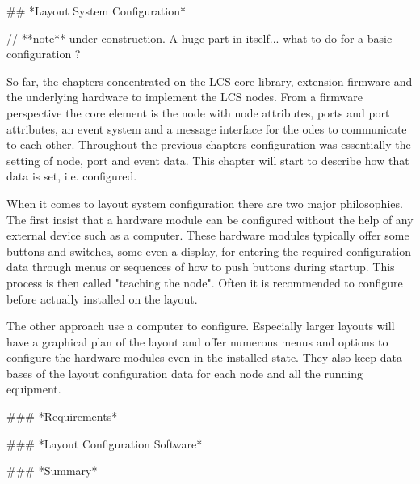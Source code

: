 ## *Layout System Configuration*

// **note** under construction. A huge part in itself... what to do for a basic configuration ?

So far, the chapters concentrated on the LCS core library, extension firmware and the underlying hardware to implement the LCS nodes. From a firmware perspective the core element is the node with node attributes, ports and port attributes, an event system and a message interface for the odes to communicate to each other. Throughout the previous chapters configuration was essentially the setting of node, port and event data. This chapter will start to describe how that data is set, i.e. configured.

When it comes to layout system configuration there are two major philosophies. The first insist that a hardware module can be configured without the help of any external device such as a computer. These hardware modules typically offer some buttons and switches, some even a display, for entering the required configuration data through menus or sequences of how to push buttons during startup. This process is then called "teaching the node". Often it is recommended to configure before actually installed on the layout.

The other approach use a computer to configure. Especially larger layouts will have a graphical plan of the layout and offer numerous menus and options to configure the hardware modules even in the installed state. They also keep data bases of the layout configuration data for each node and all the running equipment.

### *Requirements*

### *Layout Configuration Software*

### *Summary*
